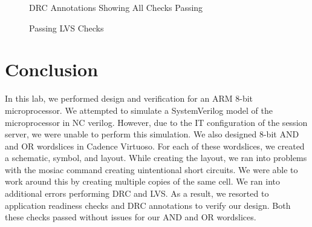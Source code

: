 \documentclass{article}
\begin{document}
	\begin{figure}[H]
		\centerline{}
		\caption{DRC Annotations Showing All Checks Passing}
		\label{fig::datapath_drc}
	\end{figure}
	
	\begin{figure}[H]
		\centerline{}
		\caption{Passing LVS Checks}
		\label{fig::datapath_lvs}
	\end{figure}
	
	\section{Conclusion}
	
	In this lab, we performed design and verification for an ARM 8-bit microprocessor. We attempted to simulate a SystemVerilog model of the microprocessor in NC verilog. However, due to the IT configuration of the session server, we were unable to perform this simulation. We also designed 8-bit AND and OR wordslices in Cadence Virtuoso. For each of these wordslices, we created a schematic, symbol, and layout. While creating the layout, we ran into problems with the mosiac command creating uintentional short circuits. We were able to work around this by creating multiple copies of the same cell. We ran into additional errors performing DRC and LVS. As a result, we resorted to application readiness checks and DRC annotations to verify our design. Both these checks passed without issues for our AND and OR wordslices. 
	
\end{document}
